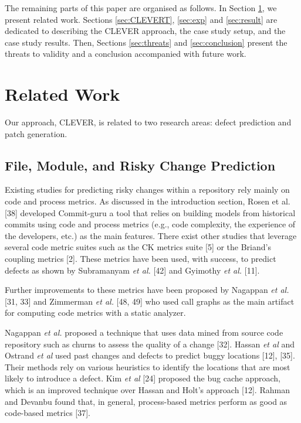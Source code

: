 \documentclass[sigconf]{acmart}
\begin{document}
The remaining parts of this paper are organised as follows. In Section
\ref{sec:relwork}, we present related work. Sections \ref{sec:CLEVERT},
\ref{sec:exp} and \ref{sec:result} are dedicated to describing the
CLEVER approach, the case study setup, and the case study results. Then,
Sections \ref{sec:threats} and \ref{sec:conclusion} present the threats
to validity and a conclusion accompanied with future work.

\section{Related Work}\label{sec:relwork}

Our approach, CLEVER, is related to two research areas: defect
prediction and patch generation.

\subsection{File, Module, and Risky Change
Prediction}\label{file-module-and-risky-change-prediction}

Existing studies for predicting risky changes within a repository rely
mainly on code and process metrics. As discussed in the introduction
section, Rosen et al. [38] developed Commit-guru a tool that relies
on building models from historical commits using code and process
metrics (e.g., code complexity, the experience of the developers, etc.)
as the main features. There exist other studies that leverage several
code metric suites such as the CK metrics suite [5] or the Briand's
coupling metrics [2]. These metrics have been used, with success, to
predict defects as shown by Subramanyam \emph{et al.} [42] and
Gyimothy \emph{et al.} [11].

Further improvements to these metrics have been proposed by Nagappan
\emph{et al.} [31, 33] and Zimmerman \emph{et al.} [48, 49] who
used call graphs as the main artifact for computing code metrics with a
static analyzer.

Nagappan \emph{et al.} proposed a technique that uses data mined from
source code repository such as churns to assess the quality of a change
[32]. Hassan \emph{et al} and Ostrand \emph{et al} used past changes
and defects to predict buggy locations [12], [35]. Their methods
rely on various heuristics to identify the locations that are most
likely to introduce a defect. Kim \emph{et al} [24] proposed the bug
cache approach, which is an improved technique over Hassan and Holt's
approach [12]. Rahman and Devanbu found that, in general,
process-based metrics perform as good as code-based metrics [37].
\end{document}
